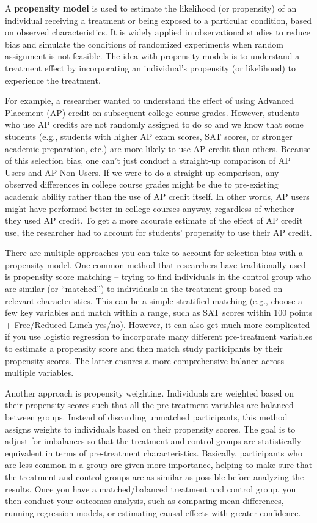 \documentclass[
  letterpaper,
  DIV=11,
  numbers=noendperiod]{scrreprt}
\begin{document}
A \textbf{propensity model} is used to estimate the likelihood (or
propensity) of an individual receiving a treatment or being exposed to a
particular condition, based on observed characteristics. It is widely
applied in observational studies to reduce bias and simulate the
conditions of randomized experiments when random assignment is not
feasible. The idea with propensity models is to understand a treatment
effect by incorporating an individual's propensity (or likelihood) to
experience the treatment.

For example, a researcher wanted to understand the effect of using
Advanced Placement (AP) credit on subsequent college course grades.
However, students who use AP credits are not randomly assigned to do so
and we know that some students (e.g., students with higher AP exam
scores, SAT scores, or stronger academic preparation, etc.) are more
likely to use AP credit than others. Because of this selection bias, one
can't just conduct a straight-up comparison of AP Users and AP
Non-Users. If we were to do a straight-up comparison, any observed
differences in college course grades might be due to pre-existing
academic ability rather than the use of AP credit itself. In other
words, AP users might have performed better in college courses anyway,
regardless of whether they used AP credit. To get a more accurate
estimate of the effect of AP credit use, the researcher had to account
for students' propensity to use their AP credit.

There are multiple approaches you can take to account for selection bias
with a propensity model. One common method that researchers have
traditionally used is propensity score matching -- trying to find
individuals in the control group who are similar (or ``matched'') to
individuals in the treatment group based on relevant characteristics.
This can be a simple stratified matching (e.g., choose a few key
variables and match within a range, such as SAT scores within 100 points
+ Free/Reduced Lunch yes/no). However, it can also get much more
complicated if you use logistic regression to incorporate many different
pre-treatment variables to estimate a propensity score and then match
study participants by their propensity scores. The latter ensures a more
comprehensive balance across multiple variables.

Another approach is propensity weighting. Individuals are weighted based
on their propensity scores such that all the pre-treatment variables are
balanced between groups. Instead of discarding unmatched participants,
this method assigns weights to individuals based on their propensity
scores. The goal is to adjust for imbalances so that the treatment and
control groups are statistically equivalent in terms of pre-treatment
characteristics. Basically, participants who are less common in a group
are given more importance, helping to make sure that the treatment and
control groups are as similar as possible before analyzing the results.
Once you have a matched/balanced treatment and control group, you then
conduct your outcomes analysis, such as comparing mean differences,
running regression models, or estimating causal effects with greater
confidence.
\end{document}
